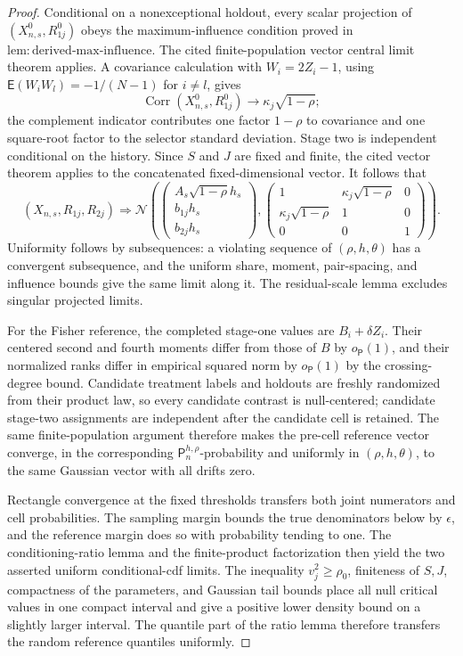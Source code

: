 \documentclass{article}
\begin{document}
\begin{proof}
Conditional on a nonexceptional holdout, every scalar projection of \((X^0_{n,s},R^0_{1j})\) obeys the maximum-influence condition proved in \(\mathrm{lem{:}derived\mbox{-}max\mbox{-}influence}\).  The cited finite-population vector central limit theorem applies.  A covariance calculation with \(W_i=2Z_i-1\), using \(\mathsf E(W_iW_l)=-1/(N-1)\) for \(i\ne l\), gives
\[
\operatorname{Corr}(X^0_{n,s},R^0_{1j})
\longrightarrow\kappa_j\sqrt{1-\rho};
\]
the complement indicator contributes one factor \(1-\rho\) to covariance and one square-root factor to the selector standard deviation.  Stage two is independent conditional on the history.  Since \(S\) and \(J\) are fixed and finite, the cited vector theorem applies to the concatenated fixed-dimensional vector.  It follows that
\[
(X_{n,s},R_{1j},R_{2j})\Longrightarrow
\mathcal N\!\left(
\begin{pmatrix}A_s\sqrt{1-\rho}h_s\\b_{1j}h_s\\b_{2j}h_s\end{pmatrix},
\begin{pmatrix}
1&\kappa_j\sqrt{1-\rho}&0\\
\kappa_j\sqrt{1-\rho}&1&0\\
0&0&1
\end{pmatrix}
\right).
\]
Uniformity follows by subsequences: a violating sequence of \((\rho,h,\theta)\) has a convergent subsequence, and the uniform share, moment, pair-spacing, and influence bounds give the same limit along it.  The residual-scale lemma excludes singular projected limits.

For the Fisher reference, the completed stage-one values are \(B_i+\delta Z_i\).  Their centered second and fourth moments differ from those of \(B\) by \(o_{\mathsf P}(1)\), and their normalized ranks differ in empirical squared norm by \(o_{\mathsf P}(1)\) by the crossing-degree bound.  Candidate treatment labels and holdouts are freshly randomized from their product law, so every candidate contrast is null-centered; candidate stage-two assignments are independent after the candidate cell is retained.  The same finite-population argument therefore makes the pre-cell reference vector converge, in the corresponding \(\mathsf P_n^{h,\rho}\)-probability and uniformly in \((\rho,h,\theta)\), to the same Gaussian vector with all drifts zero.

Rectangle convergence at the fixed thresholds transfers both joint numerators and cell probabilities.  The sampling margin bounds the true denominators below by \(\epsilon\), and the reference margin does so with probability tending to one.  The conditioning-ratio lemma and the finite-product factorization then yield the two asserted uniform conditional-cdf limits.  The inequality \(v_j^2\ge\rho_0\), finiteness of \(S,J\), compactness of the parameters, and Gaussian tail bounds place all null critical values in one compact interval and give a positive lower density bound on a slightly larger interval.  The quantile part of the ratio lemma therefore transfers the random reference quantiles uniformly.


\end{proof}
\end{document}
